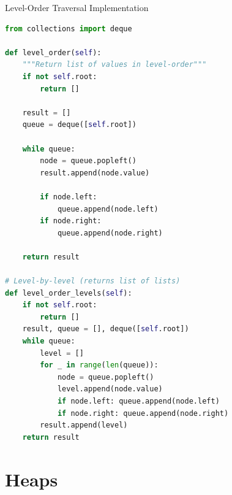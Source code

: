 \documentclass[aspectratio=169]{beamer}
\begin{document}
\begin{frame}[fragile]{Level-Order Traversal Implementation}
  \begin{lstlisting}[language=Python, basicstyle=\ttfamily\small]
from collections import deque

def level_order(self):
    """Return list of values in level-order"""
    if not self.root:
        return []

    result = []
    queue = deque([self.root])

    while queue:
        node = queue.popleft()
        result.append(node.value)

        if node.left:
            queue.append(node.left)
        if node.right:
            queue.append(node.right)

    return result

# Level-by-level (returns list of lists)
def level_order_levels(self):
    if not self.root:
        return []
    result, queue = [], deque([self.root])
    while queue:
        level = []
        for _ in range(len(queue)):
            node = queue.popleft()
            level.append(node.value)
            if node.left: queue.append(node.left)
            if node.right: queue.append(node.right)
        result.append(level)
    return result
  \end{lstlisting}
\end{frame}

\section{Heaps}
\end{document}
